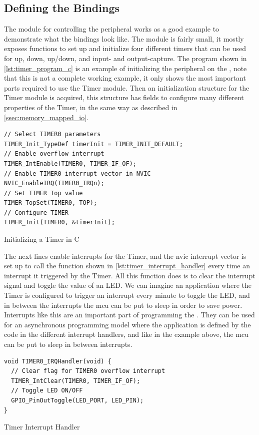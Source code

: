 \subsection{Defining the Bindings}

The {\emlib} module for controlling the  peripheral \cite{an0014_timer} works as a good example to demonstrate what the {\rust} bindings look like.
The module is fairly small, it mostly exposes functions to set up and initialize four different timers that can be used for up, down, up/down, and input- and output-capture.
The program shown in \autoref{lst:timer_program_c} is an example of initializing the  peripheral on the {\gecko}, note that this is not a complete working example, it only shows the most important parts required to use the Timer module.
Then an initialization structure for the Timer module is acquired, this structure has fields to configure many different properties of the Timer, in the same way as described in \autoref{ssec:memory_mapped_io}.

\begin{listing}[h]
\begin{verbatim}
// Select TIMER0 parameters
TIMER_Init_TypeDef timerInit = TIMER_INIT_DEFAULT;
// Enable overflow interrupt
TIMER_IntEnable(TIMER0, TIMER_IF_OF);
// Enable TIMER0 interrupt vector in NVIC
NVIC_EnableIRQ(TIMER0_IRQn);
// Set TIMER Top value
TIMER_TopSet(TIMER0, TOP);
// Configure TIMER
TIMER_Init(TIMER0, &timerInit);
\end{verbatim}
\caption{Initializing a Timer in C}
\label{lst:timer_program_c}
\end{listing}

The next lines enable interrupts for the Timer, and the \gls{nvic} interrupt vector is set up to call the function shown in \autoref{lst:timer_interrupt_handler} every time an interrupt it triggered by the Timer.
All this function does is to clear the interrupt signal and toggle the value of an LED.
We can imagine an application where the Timer is configured to trigger an interrupt every minute to toggle the LED, and in between the interrupts the \gls{mcu} can be put to sleep in order to save power.
Interrupts like this are an important part of programming the {\gecko}.
They can be used for an asynchronous programming model where the application is defined by the code in the different interrupt handlers, and like in the example above, the \gls{mcu} can be put to sleep in between interrupts.

\begin{listing}[h]
\begin{verbatim}
void TIMER0_IRQHandler(void) {
  // Clear flag for TIMER0 overflow interrupt
  TIMER_IntClear(TIMER0, TIMER_IF_OF);
  // Toggle LED ON/OFF
  GPIO_PinOutToggle(LED_PORT, LED_PIN);
}
\end{verbatim}
\caption{Timer Interrupt Handler}
\label{lst:timer_interrupt_handler}
\end{listing}

